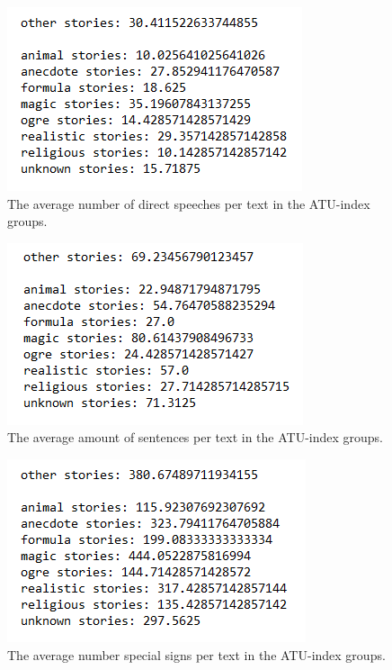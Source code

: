 \begin{figure}
\centering
\includegraphics[]{random/directspeechtext.PNG}
\caption{The average number of direct speeches per text in the ATU-index groups.}
\label{fig:rand1}
\end{figure}

\begin{figure}
\centering
\includegraphics[]{random/sentencestext.PNG}
\caption{The average amount of sentences per text in the ATU-index groups.}
\label{fig:rand2}
\end{figure}

\begin{figure}
\centering
\includegraphics[]{random/specialsignstext.PNG}
\caption{The average number special signs per text in the ATU-index groups.}
\label{fig:rand3}
\end{figure}


